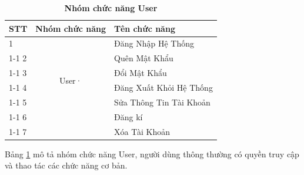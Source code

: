 \documentclass{article} %
\begin{document}
\begin{table}[H]
    \centering
    
    \caption[Nhóm chức năng User]{\bfseries\fontsize{12pt}{0pt}\selectfont Nhóm chức năng User}
    \begin{tabular}{|l|c|l|}
    \hline
    \textbf{STT} & \multicolumn{1}{l|}{\textbf{Nhóm chức năng}} & \textbf{Tên chức năng}  \\ \hline
    1            & \multirow{6}{*}{User·}                       & Đăng Nhập Hệ Thống      \\ \cline{1-1} \cline{3-3} 
    2            &                                              & Quên Mật Khẩu           \\ \cline{1-1} \cline{3-3} 
    3            &                                              & Đổi Mật Khẩu            \\ \cline{1-1} \cline{3-3} 
    4            &                                              & Đăng Xuất Khỏi Hệ Thống \\ \cline{1-1} \cline{3-3} 
    5            &                                              & Sửa Thông Tin Tài Khoản \\ \cline{1-1} \cline{3-3} 
    6            &                                              & Đăng kí           \\ \cline{1-1} \cline{3-3} 
    7            &                                              & Xóa Tài Khoản           \\ \hline
    \end{tabular}
    \label{tab:user}
\end{table}

Bảng \ref{tab:user} mô tả nhóm chức năng User, người dùng thông thường có quyền truy cập và thao tác các chức năng cơ bản.
\end{document}
